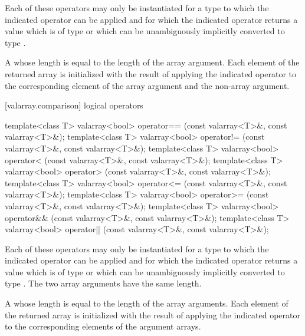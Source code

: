 \begin{itemdescr}
\pnum
\requires
Each of these operators may only be instantiated for a type 
to which the indicated operator can be applied and for which
the indicated operator returns a value which is of type 
or which can be unambiguously implicitly converted to type .

\pnum
\returns
A  whose length is equal to the
length of the array argument.
Each element of the returned array is
initialized with the result of applying the indicated operator to the
corresponding element of the array argument and the non-array argument.
\end{itemdescr}

[valarray.comparison]{ logical operators}

%
%
%
%
%
%
%
%
\begin{itemdecl}
template<class T> valarray<bool> operator==
    (const valarray<T>&, const valarray<T>&);
template<class T> valarray<bool> operator!=
    (const valarray<T>&, const valarray<T>&);
template<class T> valarray<bool> operator<
    (const valarray<T>&, const valarray<T>&);
template<class T> valarray<bool> operator>
    (const valarray<T>&, const valarray<T>&);
template<class T> valarray<bool> operator<=
    (const valarray<T>&, const valarray<T>&);
template<class T> valarray<bool> operator>=
    (const valarray<T>&, const valarray<T>&);
template<class T> valarray<bool> operator&&
    (const valarray<T>&, const valarray<T>&);
template<class T> valarray<bool> operator||
    (const valarray<T>&, const valarray<T>&);
\end{itemdecl}

\begin{itemdescr}
\pnum
\requires
Each of these operators may only be instantiated for a type 
to which the indicated operator can be applied and for which
the indicated operator returns a value which is of type 
or which can be unambiguously implicitly converted to type .
The two array arguments have the same length.

\pnum
\returns
A  whose length
is equal to the length of the array arguments.
Each element of the returned
array is initialized with the result of applying the indicated
operator to the corresponding elements of the argument arrays.
\end{itemdescr}

